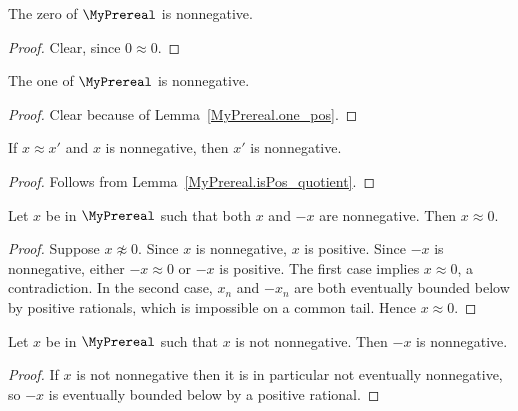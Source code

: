 \begin{lemma}
    \label{MyPrereal.zero_nonneg}
    \leanok
    The zero of $\MyPrereal$ is nonnegative.
\end{lemma}
\begin{proof}
    \leanok
    Clear, since $0 \approx 0$.
\end{proof}

\begin{lemma}
    \label{MyPrereal.one_nonneg}
    \leanok
    The one of $\MyPrereal$ is nonnegative.
\end{lemma}
\begin{proof}
    \leanok
    Clear because of Lemma~\ref{MyPrereal.one_pos}.
\end{proof}

\begin{lemma}
    \label{MyPrereal.isNonneg_quotient}
    \leanok
    If $x \approx x'$ and $x$ is nonnegative, then $x'$ is nonnegative.
\end{lemma}
\begin{proof}
    \leanok
    Follows from Lemma~\ref{MyPrereal.isPos_quotient}.
\end{proof}

\begin{lemma}
    \label{MyPrereal.eq_zero_of_isNonneg_of_isNonneg_neg}
    \leanok
    Let $x$ be in $\MyPrereal$ such that both $x$ and $-x$ are nonnegative. Then $x \approx 0$.
\end{lemma}
\begin{proof}
    \leanok
    Suppose $x \not\approx 0$. Since $x$ is nonnegative, $x$ is positive. Since $-x$ is
    nonnegative, either $-x \approx 0$ or $-x$ is positive. The first case implies
    $x \approx 0$, a contradiction. In the second case, $x_n$ and $-x_n$ are both eventually bounded
    below by positive rationals, which is impossible on a common tail. Hence $x \approx 0$.
\end{proof}

\begin{lemma}
    \label{MyPrereal.isNonneg_neg_of_not_isNonneg}
    \leanok
    Let $x$ be in $\MyPrereal$ such that $x$ is not nonnegative. Then $-x$ is nonnegative.
\end{lemma}
\begin{proof}
    \leanok
    If $x$ is not nonnegative then it is in particular not eventually nonnegative, so $-x$ is
    eventually bounded below by a positive rational.
\end{proof}

